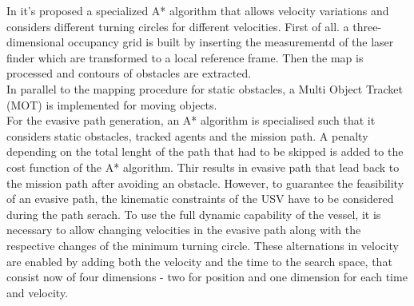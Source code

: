 \documentclass[journal]{IEEEtran}
\begin{document}
  \indent In \cite{Blaich2015} it's proposed a specialized A* algorithm that allows velocity variations and considers different turning circles for different velocities. First of all. a three-dimensional occupancy grid is built by inserting the measurementd of the laser finder which are transformed to a local reference frame. Then the map is processed and contours of obstacles are extracted.\\
  In parallel to the mapping procedure for static obstacles, a Multi Object Tracket (MOT) is implemented for moving objects.\\
  For the evasive path generation, an A* algorithm is specialised such that it considers static obstacles, tracked agents and the mission path. A penalty depending on the total lenght of the path that had to be skipped is added to the cost function of the A* algorithm. Thir results in evasive path that lead back to the mission path after avoiding an obstacle. However, to guarantee the feasibility of an evasive path, the kinematic constraints of the USV have to be considered during the path serach. To use the full dynamic capability of the vessel, it is necessary to allow changing velocities in the evasive path along with the respective changes of the minimum turning circle. These alternations in velocity are enabled by adding both the velocity and the time to the search space, that consist now of four dimensions - two for position and one dimension for each time and velocity.
\end{document}
